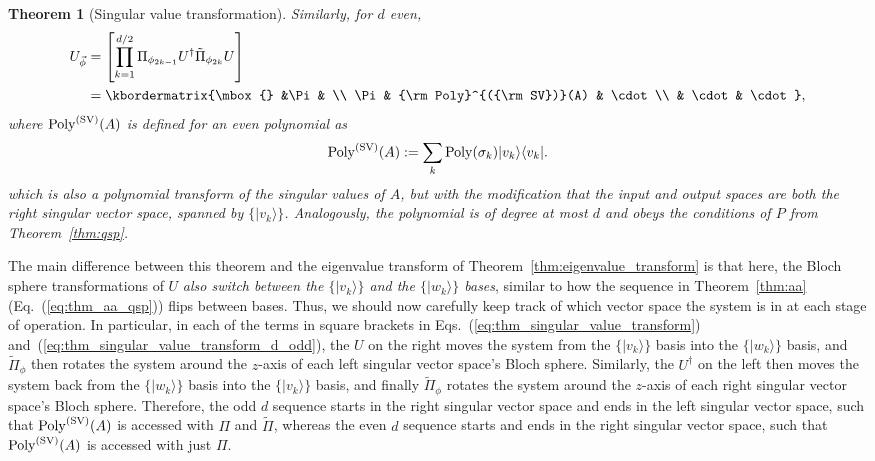 \documentclass[aps,pra,showpacs,notitlepage,twocolumn,superscriptaddress,nofootinbib]{revtex4-1}
\newtheorem{theorem}{Theorem}
\def\>{\rangle}
\def\<{\langle}
\newcommand{\be}{\begin{equation}}
\newcommand{\ee}{\end{equation}}
\begin{document}
\begin{theorem}[Singular value transformation]
        
        Similarly, for $d$ even,
            \begin{align}\label{eq:thm_singular_value_transform}
                \begin{aligned}
                      U_{\vec\phi} &= \left[ \prod_{k=1}^{d/2} \Pi_{\phi_{2k-1}} U^\dagger \tilde{\Pi}_{\phi_{2k}}  U  \right] \\ &= 
              \kbordermatrix{\mbox{} &\Pi &  \\
                \Pi & {\rm Poly}^{({\rm SV})}(A)     & \cdot \\ 
                    & \cdot & \cdot 
              },
                \end{aligned}
            \end{align}
        where $ {\rm Poly}^{({\rm SV})}(A)$ is defined for an even polynomial as
            \be
                {\rm Poly}^{({\rm SV})}(A) := \sum_{k} {\rm Poly}(\sigma_k) |v_k\>\<v_k|.
            \ee
        which is also a polynomial transform of the singular values of $A$, but with the modification that the input and output spaces are both the right singular vector space, spanned by $\{ |v_k \rangle \}$. Analogously, the polynomial is of degree at most $d$ and obeys the conditions of $P$ from Theorem~\ref{thm:qsp}.
        
    \end{theorem}

The main difference between this theorem and the eigenvalue transform of Theorem~\ref{thm:eigenvalue_transform} is that here, the Bloch sphere transformations of $U$ {\em also switch between the $\{|v_k\rangle\}$ and the $\{|w_k\rangle \}$ bases}, similar to how the sequence in Theorem~\ref{thm:aa} (Eq.~(\ref{eq:thm_aa_qsp})) flips between bases. Thus, we should now carefully keep track of which vector space the system is in at each stage of operation. In particular, in each of the terms in square brackets in Eqs.~(\ref{eq:thm_singular_value_transform}) and~(\ref{eq:thm_singular_value_transform_d_odd}), the $U$ on the right moves the system from the $\{|v_k\rangle \}$ basis into the $\{|w_k \rangle\}$ basis, and $\tilde{\Pi}_{\phi}$ then rotates the system around the $z$-axis of each left singular vector space's Bloch sphere. Similarly, the $U^\dagger$ on the left then moves the system back from the $\{| w_k \rangle \}$ basis into the $\{|v_k \rangle \}$ basis, and finally $\tilde{\Pi}_{\phi}$ rotates the system around the $z$-axis of each right singular vector space's Bloch sphere. Therefore, the odd $d$ sequence starts in the right singular vector space and ends in the left singular vector space, such that ${\rm Poly}^{({\rm SV})}(A)$ is accessed with $\Pi$ and $\tilde{\Pi}$, whereas the even $d$ sequence starts and ends in the right singular vector space, such that ${\rm Poly}^{({\rm SV})}(A)$ is accessed with just $\Pi$.
\end{document}
